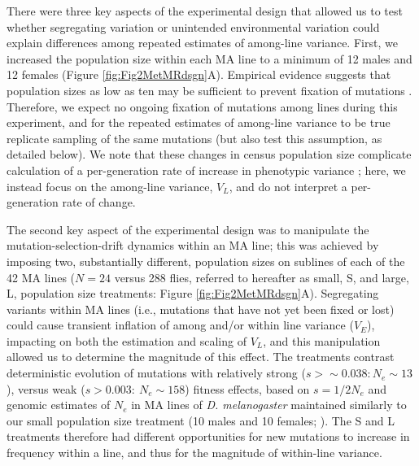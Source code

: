 There were three key aspects of the experimental design that allowed us to test whether segregating variation or unintended environmental variation could explain differences among repeated estimates of among-line variance. First, we increased the population size within each MA line to a minimum of 12 males and 12 females (Figure \ref{fig:Fig2MetMRdsgn}A). Empirical evidence suggests that population sizes as low as ten may be sufficient to prevent fixation of mutations \cite{Este04,Katj15,Luij18}. Therefore, we expect no ongoing fixation of mutations among lines during this experiment, and for the repeated estimates of among-line variance to be true replicate sampling of the same mutations (but also test this assumption, as detailed below). We note that these changes in census population size complicate calculation of a per-generation rate of increase in phenotypic variance \citep{Lync86, Lync98}; here, we instead focus on the among-line variance, $V_L$, and do not interpret a per-generation rate of change. \par

The second key aspect of the experimental design was to manipulate the mutation-selection-drift dynamics within an MA line; this was achieved by imposing two, substantially different, population sizes on sublines of each of the 42 MA lines ($N = 24$ versus 288 flies, referred to hereafter as small, S, and large, L, population size treatments: Figure \ref{fig:Fig2MetMRdsgn}A). Segregating variants within MA lines (i.e., mutations that have not yet been fixed or lost) could cause transient inflation of among and/or within line variance ($V_E$), impacting on both the estimation and scaling of $V_L$, and this manipulation allowed us to determine the magnitude of this effect. The treatments contrast deterministic evolution of mutations with relatively strong ($s > \sim0.038{: } N_e \sim 13$), versus weak ($s > 0.003{: }~N_e \sim 158$) fitness effects, based on $s = 1/2N_e$ \citep{Wrig31,Kimu83} and genomic estimates of $N_e$ in MA lines of \textit{D. melanogaster} maintained similarly to our small population size treatment (10 males and 10 females; \citealp{Huan16}). The S and L treatments therefore had different opportunities for new mutations to increase in frequency within a line, and thus for the magnitude of within-line variance.\par

